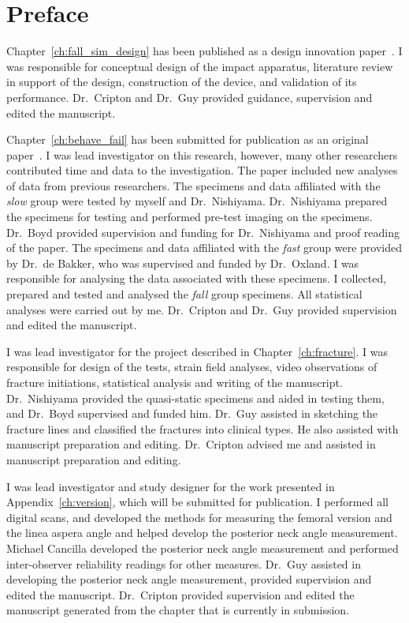 
\chapter{Preface}
Chapter~\ref{ch:fall_sim_design} has been published as a design innovation paper~\citep{gilchrist_development_2013}.
I was responsible for conceptual design of the impact apparatus, literature review in support of the design, construction of the device, and validation of its performance.
Dr.\ Cripton and Dr.\ Guy provided guidance, supervision and edited the manuscript.

Chapter~\ref{ch:behave_fail} has been submitted for publication as an original paper~\citep{gilchrist_mechanics_2013}.
I was lead investigator on this research, however, many other researchers contributed time and data to the investigation.
The paper included new analyses of data from previous researchers.
The specimens and data affiliated with the \textit{slow} group were tested by myself and Dr.\ Nishiyama. Dr.\ Nishiyama prepared the specimens for testing and performed pre-test imaging on the specimens.
Dr.\ Boyd provided supervision and funding for Dr.\ Nishiyama and proof reading of the paper.
The specimens and data affiliated with the \textit{fast} group were provided by Dr.\ de Bakker, who was supervised and funded by Dr.\ Oxland.
I was responsible for analysing the data associated with these specimens.
I collected, prepared and tested and analysed the \textit{fall} group specimens.
All statistical analyses were carried out by me.
Dr.\ Cripton and Dr.\ Guy provided supervision and edited the manuscript.

I was lead investigator for the project described in Chapter~\ref{ch:fracture}.
I was responsible for design of the tests, strain field analyses, video observations of fracture initiations, statistical analysis and writing of the manuscript.
Dr.\ Nishiyama provided the quasi-static specimens and aided in testing them, and Dr.\ Boyd supervised and funded him.
Dr.\ Guy assisted in sketching the fracture lines and classified the fractures into clinical types.
He also assisted with manuscript preparation and editing.
Dr.\ Cripton advised me and assisted in manuscript preparation and editing.

I was lead investigator and study designer for the work presented in Appendix~\ref{ch:version}, which will be submitted for publication.
I performed all digital scans, and developed the methods for measuring the femoral version and the linea aspera angle and helped develop the posterior neck angle measurement.
Michael Cancilla developed the posterior neck angle measurement and performed inter-observer reliability readings for other measures.
Dr.\ Guy assisted in developing the posterior neck angle measurement, provided supervision and edited the manuscript.
Dr.\ Cripton provided supervision and edited the manuscript generated from the chapter that is currently in submission.

